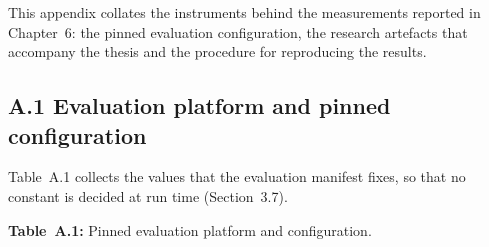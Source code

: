 \documentclass[
]{article}
\begin{document}
This appendix collates the instruments behind the measurements reported
in Chapter~6: the pinned evaluation configuration, the research
artefacts that accompany the thesis and the procedure for reproducing
the results.

\hypertarget{a.1-evaluation-platform-and-pinned-configuration}{%
\subsection{A.1 Evaluation platform and pinned
configuration}\label{a.1-evaluation-platform-and-pinned-configuration}}

Table~A.1 collects the values that the evaluation manifest fixes, so
that no constant is decided at run time (Section~3.7).

\protect\hypertarget{_Toc900171}{}{}\textbf{Table~A.1:} Pinned
evaluation platform and configuration.
\end{document}
